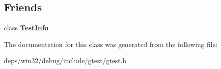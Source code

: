 \subsection*{Friends}
\begin{DoxyCompactItemize}
\item 
\hypertarget{classtesting_1_1_test_aed3c96e2bd5a46339c1cbe49a4a233ee}{}class {\bfseries Test\+Info}\label{classtesting_1_1_test_aed3c96e2bd5a46339c1cbe49a4a233ee}

\end{DoxyCompactItemize}


The documentation for this class was generated from the following file\+:\begin{DoxyCompactItemize}
\item 
deps/win32/debug/include/gtest/gtest.\+h\end{DoxyCompactItemize}
